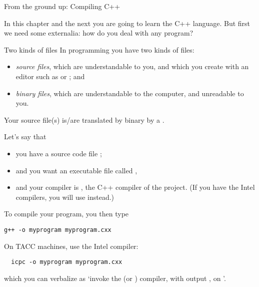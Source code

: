 
 {From the ground up: Compiling C++}

In this chapter and the next you are going to learn the C++
language. But first we need some externalia: how do you deal with any
program?

\begin{block}{Two kinds of files}
  \label{sl:sourcebinary}
  In programming you have two kinds of files:
  \begin{itemize}
  \item \emph{source files}, which are understandable
    to you, and which you create with an editor such as  or
    ; and
  \item \emph{binary files}, which are understandable
    to the computer, and unreadable to you.
  \end{itemize}
  Your source file(s) is/are translated by binary by a
  .
\end{block}

Let's say that
\begin{itemize}
\item you have a source code file ;
\item and you want an executable file called ,
\item and your compiler is , the C++ compiler of the
   project. (If you have the Intel compilers, you will
  use  instead.)
\end{itemize}
To compile your program, you then type
\begin{verbatim}
g++ -o myprogram myprogram.cxx
\end{verbatim}
\begin{tacc}
  On TACC machines, use the Intel compiler:
\begin{verbatim}
  icpc -o myprogram myprogram.cxx
\end{verbatim}
\end{tacc}

which you can verbalize as `invoke the  (or ) compiler,
with output , on '.

